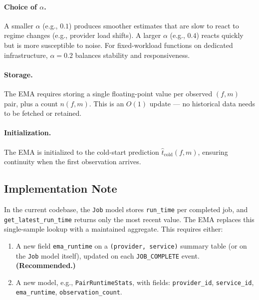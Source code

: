 \documentclass[11pt, a4paper]{article}
\newcommand{\bluecontentbegin}{\begingroup\color{blue!70!black}}
\newcommand{\bluecontentend}{\endgroup}
\begin{document}
\paragraph{Choice of $\alpha$.}
A smaller $\alpha$ (e.g., $0.1$) produces smoother estimates that are slow to
react to regime changes (e.g., provider load shifts). A larger $\alpha$ (e.g.,
$0.4$) reacts quickly but is more susceptible to noise. For fixed-workload
functions on dedicated infrastructure, $\alpha = 0.2$ balances stability and
responsiveness.

\paragraph{Storage.}
The EMA requires storing a single floating-point value per observed $(f, m)$
pair, plus a count $n(f, m)$. This is an $O(1)$ update --- no historical
data needs to be fetched or retained.

\paragraph{Initialization.}
The EMA is initialized to the cold-start prediction
$\hat{t}_{\mathrm{cold}}(f, m)$, ensuring continuity when the first
observation arrives.

\subsection{Implementation Note}
\bluecontentbegin

In the current codebase, the \texttt{Job} model stores \texttt{run\_time} per
completed job, and \texttt{get\_latest\_run\_time} returns only the most recent
value. The EMA replaces this single-sample lookup with a maintained aggregate.
This requires either:

\begin{enumerate}[label=(\alph*)]
    \item A new field \texttt{ema\_runtime} on a \texttt{(provider, service)}
          summary table (or on the \texttt{Job} model itself), updated on each
          \texttt{JOB\_COMPLETE} event. \textbf{(Recommended.)}
    \item A new model, e.g., \texttt{PairRuntimeStats}, with fields:
          \texttt{provider\_id}, \texttt{service\_id},
          \texttt{ema\_runtime}, \texttt{observation\_count}.
\end{enumerate}
\bluecontentend

\end{document}
